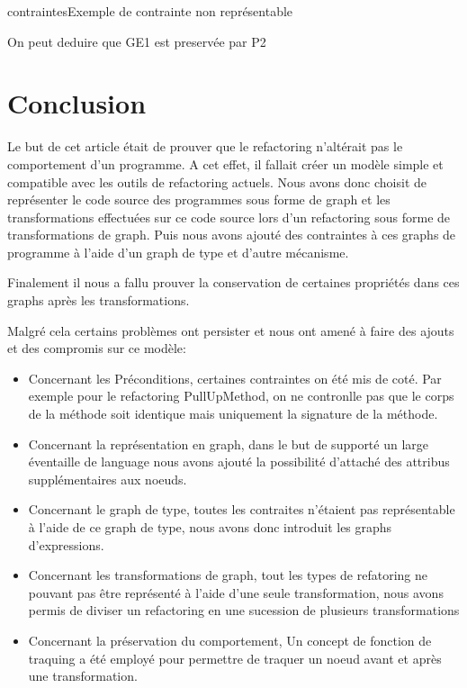 \documentclass[a4paper, 12pt]{article}
\begin{document}
\begin{figu}{contraintes}{Exemple de contrainte non représentable}
{\begin{enumerate}
    On peut deduire que GE1 est preservée par P2
  \end{enumerate}

  \section{Conclusion}

  Le but de cet article était de prouver que le refactoring n'altérait pas le comportement d'un programme.
  A cet effet, il fallait créer un modèle simple et compatible avec les outils de refactoring actuels. Nous avons donc choisit de représenter le code source des programmes sous forme de graph
  et les transformations effectuées sur ce code source lors d'un refactoring sous forme de transformations de graph. Puis nous avons ajouté des contraintes à ces graphs de programme à l'aide d'un graph de type et d'autre mécanisme.

  Finalement il nous a fallu prouver la conservation de certaines propriétés dans ces graphs après les transformations.

  Malgré cela certains problèmes ont persister et nous ont amené à faire des ajouts et des compromis sur ce modèle:

  \begin{itemize}[label=\textbullet]
    \item Concernant les Préconditions, certaines contraintes on été mis de coté. Par exemple pour le refactoring PullUpMethod, on ne contronlle pas que le corps de la méthode soit identique mais uniquement la signature de la méthode.

    \item Concernant la représentation en graph, dans le but de supporté un large éventaille de language nous avons ajouté la possibilité d'attaché des attribus supplémentaires aux noeuds.

    \item Concernant le graph de type, toutes les contraites n'étaient pas représentable à l'aide de ce graph de type, nous avons donc introduit les graphs d'expressions.

    \item Concernant les transformations de graph, tout les types de refatoring ne pouvant pas être représenté à l'aide d'une seule transformation, nous avons permis de diviser un refactoring en une sucession de plusieurs transformations

    \item Concernant la préservation du comportement, Un concept de fonction de traquing a été employé pour permettre de traquer un noeud avant et après une transformation.
  \end{itemize}

}
\end{figu}
\end{document}
